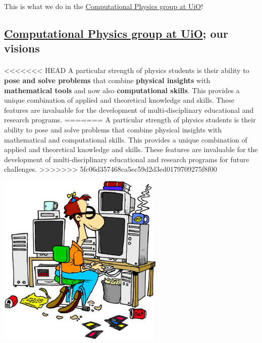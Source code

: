 \documentclass[%
<<<<<<< HEAD
oneside,                 %
final,                   %
=======
twoside,                 %
final,                   %
>>>>>>> 5fc06d357468ca5ec59d2d3ed0179709275f8f00
10pt]{article}
\begin{document}
\noindent
This is what we do in the \href{{http://www.mn.uio.no/fysikk/english/research/groups/computational/index.html}}{Computational Physics group at UiO}!




\subsection*{\href{{http://www.mn.uio.no/fysikk/english/research/groups/computational/index.html}}{Computational Physics group at UiO}; our visions}


\paragraph{}
<<<<<<< HEAD
A particular strength of physics students is their ability to \textbf{pose and
solve problems} that combine \textbf{physical insights} with \textbf{mathematical tools}
and now also \textbf{computational skills}. This provides a unique combination
of applied and theoretical knowledge and skills. These features are invaluable
for the development of multi-disciplinary educational and research programs.
=======
A particular strength of physics students is their ability to pose and
solve problems that combine physical insights with mathematical
and  computational skills. This provides a unique combination
of applied and theoretical knowledge and skills. These features are invaluable 
for the development of multi-disciplinary educational and research programs for future challenges.
>>>>>>> 5fc06d357468ca5ec59d2d3ed0179709275f8f00





\centerline{\includegraphics[width=1.0\linewidth]{fig-future/computer_nerd2.jpg}}
\end{document}
